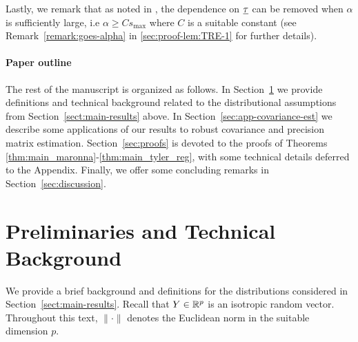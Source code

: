 \documentclass[times,sort&compress,3p]{elsarticle}
\begin{document}
%
Lastly, we remark that as noted in \cite{goes2017robust}, the dependence on $\underline{\tau}$ can be removed when $\alpha$ is sufficiently large, i.e  $\alpha \ge Cs_{\max}$ where $C$ is a suitable constant (see Remark~\ref{remark:goes-alpha} in 
\ref{sec:proof-lem:TRE-1} for further details). 

        
        \paragraph{Paper outline} 
        The rest of the manuscript is organized as follows.
        In Section~\ref{sec:prelims} we provide definitions and technical background related to the distributional assumptions from Section~\ref{sect:main-results} above. In Section~\ref{sec:app-covariance-est} we describe some applications of our results to robust covariance and precision matrix estimation.
        Section~\ref{sec:proofs} is devoted to the proofs of Theorems \ref{thm:main_maronna}-\ref{thm:main_tyler_reg}, with some technical details deferred to the Appendix. Finally, we offer some concluding remarks in Section~\ref{sec:discussion}. 
        
\section{Preliminaries and Technical Background}
\label{sec:prelims}

We provide a brief background and definitions for the distributions considered in Section~\ref{sect:main-results}. 
Recall that $Y\in\mathbb{R}^p$
is an isotropic random vector. Throughout this text, $\|\cdot\|$ denotes the Euclidean norm in the suitable dimension $p$.
\end{document}
